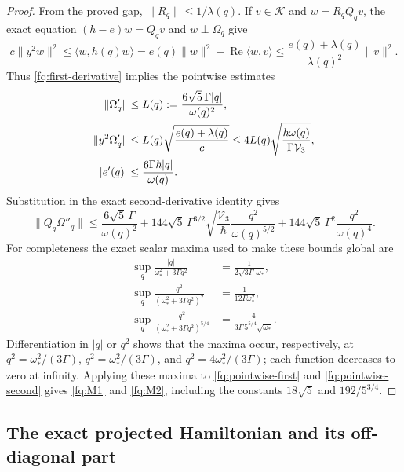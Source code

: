 \begin{proof}
From the proved gap, $\|R_q\|\leq1/\lambda(q)$. If $v\in\mathscr K$
and $w=R_qQ_qv$, the exact equation $(h-e)w=Q_qv$ and $w\perp\Omega_q$
give
\[
 c\|y^2w\|^2\leq\langle w,h(q)w\rangle
 =e(q)\|w\|^2+\operatorname{Re}\langle w,v\rangle
 \leq\frac{e(q)+\lambda(q)}{\lambda(q)^2}\|v\|^2.
\]
Thus \eqref{fq:first-derivative} implies the pointwise estimates
\begin{align}
 \|\Omega'_q\|&\leq
       L(q):=\frac{6\sqrt5\,\Gamma|q|}{\omega(q)^2},\notag\\
 \|y^2\Omega'_q\|&\leq
       L(q)\sqrt{\frac{e(q)+\lambda(q)}c}
       \leq4L(q)\sqrt{\frac{\hbar\omega(q)}{\Gamma\mathcal V_3}},
       \label{fq:pointwise-first}\\
 |e'(q)|&\leq\frac{6\Gamma\hbar|q|}{\omega(q)}.\notag
\end{align}
Substitution in the exact second-derivative identity gives
\begin{equation}\label{fq:pointwise-second}
 \|Q_q\Omega''_q\|\leq
 \frac{6\sqrt5\,\Gamma}{\omega(q)^2}
 +144\sqrt5\,\Gamma^{3/2}\sqrt{\frac{\mathcal V_3}{\hbar}}
                      \frac{q^2}{\omega(q)^{5/2}}
 +144\sqrt5\,\Gamma^2\frac{q^2}{\omega(q)^4}.
\end{equation}
For completeness the exact scalar maxima used to make these
bounds global are
\begin{align*}
 \sup_q\frac{|q|}{\omega_*^2+3\Gamma q^2}
       &=\frac1{2\sqrt{3\Gamma}\,\omega_*},\\
 \sup_q\frac{q^2}{(\omega_*^2+3\Gamma q^2)^2}
       &=\frac1{12\Gamma\omega_*^2},\\
 \sup_q\frac{q^2}{(\omega_*^2+3\Gamma q^2)^{5/4}}
       &=\frac4{3\Gamma\,5^{5/4}\sqrt{\omega_*}}.
\end{align*}
Differentiation in $|q|$ or $q^2$ shows that the maxima occur,
respectively, at $q^2=\omega_*^2/(3\Gamma)$,
$q^2=\omega_*^2/(3\Gamma)$, and $q^2=4\omega_*^2/(3\Gamma)$;
each function decreases to zero at infinity. Applying these
maxima to \eqref{fq:pointwise-first} and
\eqref{fq:pointwise-second} gives \eqref{fq:M1} and
\eqref{fq:M2}, including the constants $18\sqrt5$ and
$192/5^{3/4}$.
\end{proof}

\subsection{The exact projected Hamiltonian and its off-diagonal part}

